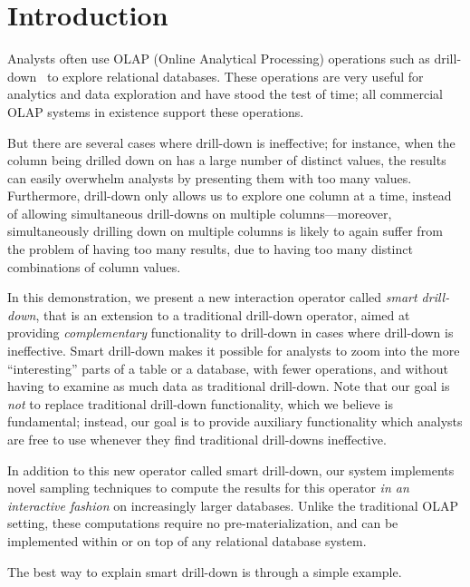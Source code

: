
\section{Introduction} \label{sec:intro} 

Analysts often use OLAP (Online Analytical Processing) operations
such as drill-down~\cite{export:69578} to explore
relational databases. 
These operations are very useful for analytics and data exploration and have stood the test of time;
all commercial OLAP systems 
in existence support these operations.

But there are several cases where drill-down is ineffective; 
for instance, when the column being drilled down on has a large number of distinct values,
the results can easily overwhelm analysts by presenting them with too many 
values. Furthermore, drill-down only allows us to explore one column at a time, instead of allowing simultaneous drill-downs
on multiple columns---moreover, simultaneously drilling down on multiple columns 
is likely to again suffer from the problem
of having too many results, due to having too many distinct combinations of column values.

In this demonstration, we present a new interaction operator called {\em smart drill-down}, 
that is an extension to a traditional 
drill-down operator, aimed at providing {\em complementary}
functionality to drill-down in cases where drill-down is
ineffective. Smart drill-down makes it possible for analysts to zoom into
the more ``interesting'' parts of a table or a database,
with fewer operations, and without having to examine as much
data as traditional drill-down.
Note that our goal is {\em not} to replace traditional 
drill-down functionality, which we believe is fundamental;
instead, our goal is to provide auxiliary functionality 
which analysts are free to use whenever they find 
traditional drill-downs ineffective.

In addition to this new operator called smart drill-down, our system implements novel sampling techniques to compute the results for this
operator {\em in an interactive fashion} on increasingly larger databases. 
Unlike the traditional OLAP setting, these computations 
require no pre-materialization, and can be implemented 
within or on top of any relational database system.

The best way to explain smart drill-down is through a simple example.

